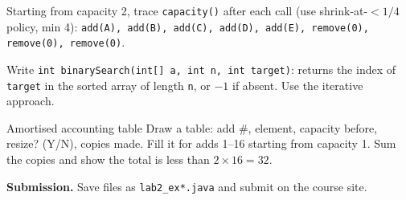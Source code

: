 \documentclass[11pt]{article}
\begin{document}
\begin{trace}
Starting from capacity 2, trace \texttt{capacity()} after each call (use shrink-at-$<1/4$ policy, min 4):
\texttt{add(A), add(B), add(C), add(D), add(E), remove(0), remove(0), remove(0)}.
\end{trace}

\begin{writecode}
Write \texttt{int binarySearch(int[] a, int n, int target)}: returns the index of \texttt{target}
in the sorted array of length \texttt{n}, or $-1$ if absent. Use the iterative approach.
\end{writecode}

\begin{drawex}{Amortised accounting table}
Draw a table: add \#, element, capacity before, resize? (Y/N), copies made.
Fill it for adds 1--16 starting from capacity 1.
Sum the copies and show the total is less than $2 \times 16 = 32$.
\end{drawex}

\vspace{4pt}
\noindent\textbf{Submission.} Save files as \texttt{lab2\_ex*.java} and submit on the course site.
\end{document}
